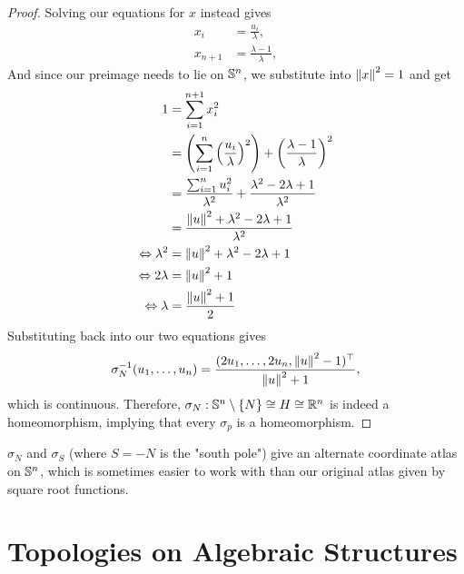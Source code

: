 \begin{proof}
	Solving our equations for $x$ instead gives
	\begin{align*}
		x_i &= \frac{u_i}{\lambda},\\
		x_{n+1} &= \frac{\lambda - 1}{\lambda},
	\end{align*}
	And since our preimage needs to lie on $\mathbb{S}^n$, we substitute into $\norm{x}^2 = 1$ and get
	\begin{align*}
		1
		&= 
		\sum_{i = 1}^{n+1} x_i^2\\
		&=
		\qty(\sum_{i = 1}^{n} \qty(\frac{u_i}{\lambda})^2) + \qty(\frac{\lambda - 1}{\lambda})^2\\
		&=
		\frac{\sum_{i = 1}^{n} u_i^2}{\lambda^2} + \frac{\lambda^2 - 2\lambda + 1}{\lambda^2}\\
		&=
		\frac{\norm{u}^2 + \lambda^2 - 2\lambda + 1}{\lambda^2}\\
		\Leftrightarrow
		\lambda^2 
		&=
		\norm{u}^2 + \lambda^2 - 2\lambda + 1\\
		\Leftrightarrow 
		2\lambda 
		&= 
		\norm{u}^2 + 1\\
		\Leftrightarrow 
		\lambda 
		&= 
		\frac{\norm{u}^2 + 1}{2}\\
	\end{align*}
	Substituting back into our two equations gives
	\begin{align*}
		\sigma_N^{-1}(u_1, \hdots, u_n) = \frac{(2u_1, \hdots, 2u_n, \norm{u}^2 - 1)^\top}{\norm{u}^2 + 1},
	\end{align*}
	which is continuous. Therefore, $\sigma_N : \mathbb{S}^n \setminus \qty{N} \cong H \cong \mathbb{R}^n$ is indeed a homeomorphism, implying that every $\sigma_p$ is a homeomorphism.
\end{proof}
$\sigma_N$ and $\sigma_S$ (where $S = -N$ is the "south pole") give an alternate coordinate atlas on $\mathbb{S}^n$, which is sometimes easier to work with than our original atlas given by square root functions.

\chapter{Topologies on Algebraic Structures}

